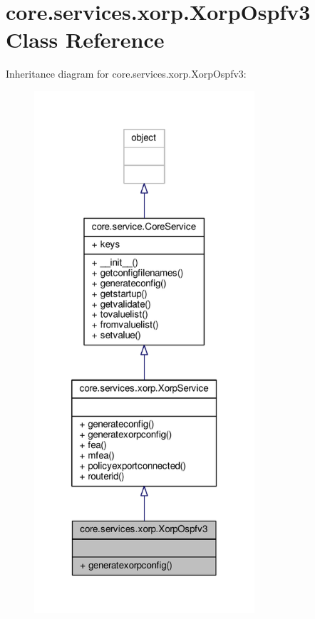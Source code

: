 \hypertarget{classcore_1_1services_1_1xorp_1_1_xorp_ospfv3}{\section{core.\+services.\+xorp.\+Xorp\+Ospfv3 Class Reference}
\label{classcore_1_1services_1_1xorp_1_1_xorp_ospfv3}
}


Inheritance diagram for core.\+services.\+xorp.\+Xorp\+Ospfv3\+:
\nopagebreak
\begin{figure}[H]
\begin{center}
\leavevmode
\includegraphics[height=550pt]{classcore_1_1services_1_1xorp_1_1_xorp_ospfv3__inherit__graph}
\end{center}
\end{figure}



